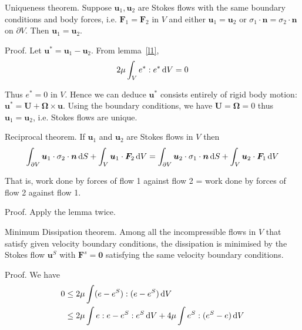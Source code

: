 \documentclass{jknotes}
\begin{document}
\begin{theorem}
	Uniqueness theorem. Suppose $\bm{u}_1, \bm{u}_2$ are Stokes flows with the
	same boundary conditions and body forces, i.e. $\bm{F}_1 = \bm{F}_2$ in
	$V$ and either $\bm{u}_1 = \bm{u}_2$ or $\sigma_1 \cdot \bm{n} = \sigma_2
	\cdot \bm{n}$ on $\partial V$. Then $\bm{u}_1 = \bm{u}_2$.
\end{theorem}

Proof. Let $\bm{u}^* = \bm{u}_1 - \bm{u}_2$. From lemma~\ref{l1}, 
\begin{equation}
	2\mu \int_V e^* : e^* \, \diffd V = 0
\end{equation}

Thus $e^* = 0$ in $V$. Hence we can deduce $\bm{u}^*$ consists entirely of
rigid body motion: $\bm{u}^* = \bm{U} + \bm{\Omega} \times \bm{u}$. Using the
boundary conditions, we have $\bm{U} = \bm{\Omega} = 0$ thus $\bm{u}_1 =
\bm{u}_2$, i.e. Stokes flows are unique.

\begin{theorem}
	Reciprocal theorem. If $\bm{u}_1$ and $\bm{u}_2$ are Stokes flows in $V$
	then
	\begin{equation}
		\int_{\partial V} \bm{u}_1 \cdot \sigma_2 \cdot \bm{n} \, \diffd S +
		\int_V \bm{u}_1 \cdot \bm{F}_2 \, \diffd V = 
		\int_{\partial V} \bm{u}_2 \cdot \sigma_1 \cdot \bm{n} \, \diffd S +
		\int_V \bm{u}_2 \cdot \bm{F}_1 \, \diffd V
	\end{equation}

	That is, work done by forces of flow 1 against flow 2 = work done by
	forces of flow 2 against flow 1.
\end{theorem}

Proof. Apply the lemma twice.

\begin{theorem}
	Minimum Dissipation theorem. Among all the incompressible flows in $V$
	that satisfy given velocity boundary conditions, the dissipation is
	minimised by the Stokes flow $\bm{u}^S$ with $\bm{F}^s = \bm{0}$
	satisfying the same velocity boundary conditions.
\end{theorem}

Proof. We have
\begin{equation}
	\begin{aligned}
		0 &\le 2\mu \int (e - e^S):(e-e^S) \, \diffd V \\
		  &\le 2\mu \int e:e - e^S:e^S \, \diffd V + 4\mu \int e^S : (e^S
		-e)\,\diffd V
	\end{aligned}
\end{equation}
\end{document}
